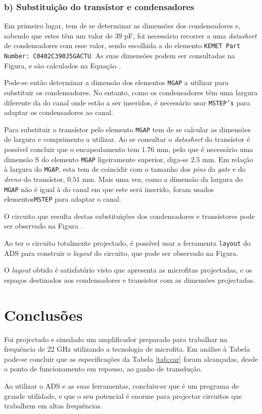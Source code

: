 \documentclass[11pt]{article}
\numberwithin{equation}{section}
\begin{document}
\subsubsection{b) Substituição do transístor e condensadores}

Em primeiro lugar, tem de se determinar as dimensões dos condensadores e, sabendo que estes têm um valor de 39 pF, foi necessário recorrer a uma \textit{datasheet} de condensadores com esse valor, sendo escolhida a do elemento \texttt{KEMET Part Number: C0402C390J5GACTU}. As suas dimensões podem ser consultadas na Figura, e são calculados na Equação .


\vspace{-1mm}
Pode-se então determinar a dimensão dos elementos \texttt{MGAP} a utilizar para substituir os condensadores. No entanto, como os condensadores têm uma largura diferente da do canal onde estão a ser inseridos, é necessário usar \texttt{MSTEP's} para adaptar os condensadores ao canal.

Para substituir o transístor pelo elemento \texttt{MGAP} tem de se calcular as dimensões de largura e comprimento a utilizar. Ao se consultar o \textit{datasheet} do transístor é possível concluir que o encapsulamento tem $1.76$ mm, pelo que é necessário uma dimensão S do elemento \texttt{MGAP} ligeiramente superior, diga-se $2.5$ mm. Em relação à largura do \texttt{MGAP}, esta tem de coincidir com o tamanho dos \textit{pins} da \textit{gate} e do \textit{dreno} do transístor, $0.51$ mm. Mais uma vez, como a dimensão da largura do \texttt{MGAP} não é igual à do canal em que este será inserido, foram usados elementos\texttt{MSTEP} para adaptar o canal.

O circuito que resulta destas substituições dos condensadores e transístores pode ser observado na Figura .


Ao ter o circuito totalmente projectado, é possível usar a ferramenta \texttt{layout} do ADS para construir o \textit{layout} do circuito, que pode ser observado na Figura.


O \textit{layout} obtido é satisfatório visto que apresenta as microfitas projectadas, e os espaços destinados aos condensadores e transistor com as dimensões projectadas.
 
\section{Conclusões}

Foi projectado e simulado um amplificador preparado para trabalhar na frequência de 22 GHz utilizando a tecnologia de microfita. Em análise à Tabela pode-se concluir que as especificações da Tabela \ref{tab:car} foram alcançadas, desde o ponto de funcionamento em repouso, ao ganho de transdução.

Ao utilizar o ADS e as suas ferramentas, concluiu-se que é um programa de grande utilidade, e que o seu potencial é enorme para projectar circuitos que trabalhem em altas frequências.
\end{document}
